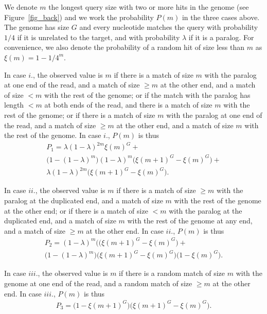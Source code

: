 \documentclass[english]{article}
\begin{document}
We denote $m$ the longest query size with two or more hits in the genome
(see Figure~\ref{fig_back}) and we work the probability $P(m)$ in the
three cases above. The genome has size $G$ and every nucleotide matches
the query with probability $1/4$ if it is unrelated to the target, and
with probability $\lambda$ if it is a paralog. For convenience, we also
denote the probability of a random hit of size less than $m$ as $\xi(m) =
1-1/4^m$.

In case $i.$, the observed value is $m$ if there is a match of size $m$
with the paralog at one end of the read, and a match of size $\geq m$ at
the other end, and a match of size $< m$ with the rest of the genome;
or if the match with the paralog has length $< m$ at both ends of the
read, and there is a match of size $m$ with the rest of the genome; or if
there is a match of size $m$ with the paralog at one end of the read, and
a match of size $\geq m$ at the other end, and a match of size $m$ with
the rest of the genome. In case $i.$, $P(m)$ is thus
\begin{align*}
P_1 = \lambda (1-\lambda)^{2m} \xi(m)^G + \\
\big(1-(1-\lambda)^m\big)(1-\lambda)^m \big(\xi(m+1)^G - \xi(m)^G\big) + \\
\lambda (1-\lambda)^{2m} \big(\xi(m+1)^G - \xi(m)^G\big).
\end{align*}

In case $ii.$, the observed value is $m$ if there is a match of size $\geq
m$ with the paralog at the duplicated end, and a match of size $m$ with
the rest of the genome at the other end; or if there is a match of size $<
m$ with the paralog at the duplicated end, and a match of size $m$ with
the rest of the genome at any end, and a match of size $\geq m$ at the
other end. In case $ii.$, $P(m)$ is thus
\begin{align*}
P_2 = (1-\lambda)^m \big((\xi(m+1)^G - \xi(m)^G\big) + \\
\big(1-(1-\lambda)^m\big) \big(\xi(m+1)^G - \xi(m)^G\big)
\big(1 - \xi(m)^G\big).
\end{align*}

In case $iii.$, the observed value is $m$ if there is a random match of
size $m$ with the genome at one end of the read, and a random match of
size $\geq m$ at the other end. In case $iii.$, $P(m)$ is thus
\begin{align*}
P_3 = \big(1-\xi(m+1)^G\big) \big(\xi(m+1)^G - \xi(m)^G\big).
\end{align*}
\end{document}
